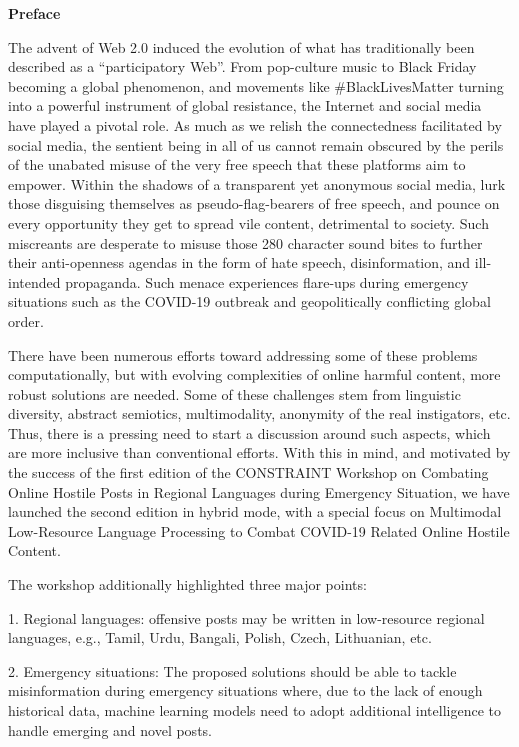 \documentclass[11pt,oneside]{book}
\begin{document}
  \begin{center}
   { \Large \textbf{Preface}}
  \end{center}
  \vspace*{0.5cm}
  The advent of Web 2.0 induced the evolution of what has traditionally been described as a “participatory Web”. From pop-culture music to Black Friday becoming a global phenomenon, and movements like #BlackLivesMatter turning into a powerful instrument of global resistance, the Internet and social media have played a pivotal role. As much as we relish the connectedness facilitated by social media, the sentient being in all of us cannot remain obscured by the perils of the unabated misuse of the very free speech that these platforms aim to empower. Within the shadows of a transparent yet anonymous social media, lurk those disguising themselves as pseudo-flag-bearers of free speech, and pounce on every opportunity they get to spread vile content, detrimental to society. Such miscreants are desperate to misuse those 280 character sound bites to further their anti-openness agendas in the form of hate speech, disinformation, and ill-intended propaganda. Such menace experiences flare-ups during emergency situations such as the COVID-19 outbreak and geopolitically conflicting global order.

There have been numerous efforts toward addressing some of these problems computationally, but with evolving complexities of online harmful content, more robust solutions are needed. Some of these challenges stem from linguistic diversity, abstract semiotics, multimodality, anonymity of the real instigators, etc. Thus, there is a pressing need to start a discussion around such aspects, which are more inclusive than conventional efforts. With this in mind, and motivated by the success of the first edition of the CONSTRAINT Workshop on ​Combating Online Ho​st​ile Posts in ​Regional Languages during Emergency Situation, we have launched the second edition in hybrid mode, with a special focus on Multimodal Low-Resource Language Processing to Combat COVID-19 Related Online Hostile Content.    

The workshop additionally highlighted three major points:

1. Regional languages: offensive posts may be written in low-resource regional languages, e.g., Tamil, Urdu, Bangali, Polish, Czech, Lithuanian, etc.

2.  Emergency situations: ​The proposed solutions should be able to tackle misinformation during emergency situations where, due to the lack of enough historical data, machine learning models need to adopt additional intelligence to handle emerging and novel posts.
\end{document}
